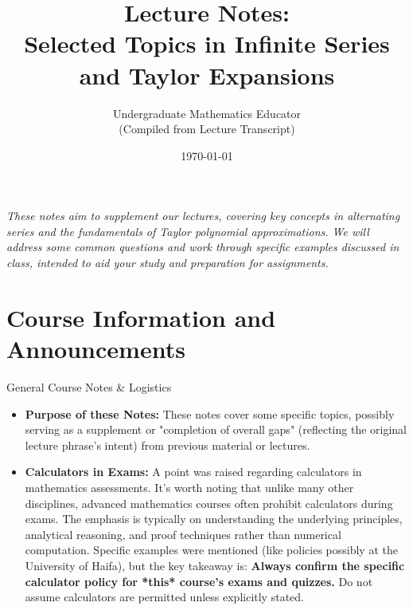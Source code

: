\documentclass[11pt, a4paper]{article}
\title{Lecture Notes: \\ Selected Topics in Infinite Series and Taylor Expansions}
\author{Undergraduate Mathematics Educator \\ (Compiled from Lecture Transcript)}
\date{\today}
\theoremstyle{plain} %
\theoremstyle{definition} %
\begin{document}
\maketitle
\begin{center}
    \textit{These notes aim to supplement our lectures, covering key concepts in alternating series and the fundamentals of Taylor polynomial approximations. We will address some common questions and work through specific examples discussed in class, intended to aid your study and preparation for assignments.}
\end{center}
\tableofcontents
\newpage

\section*{Course Information and Announcements}

\begin{announcement}{General Course Notes \& Logistics} %
\begin{itemize}
    \item \textbf{Purpose of these Notes:} These notes cover some specific topics, possibly serving as a supplement or "completion of overall gaps" (reflecting the original lecture phrase's intent) from previous material or lectures.
    \item \textbf{Calculators in Exams:} A point was raised regarding calculators in mathematics assessments. It's worth noting that unlike many other disciplines, advanced mathematics courses often prohibit calculators during exams. The emphasis is typically on understanding the underlying principles, analytical reasoning, and proof techniques rather than numerical computation. Specific examples were mentioned (like policies possibly at the University of Haifa), but the key takeaway is: \textbf{Always confirm the specific calculator policy for *this* course's exams and quizzes.} Do not assume calculators are permitted unless explicitly stated.
\end{itemize}
\end{announcement} %

\end{document}
